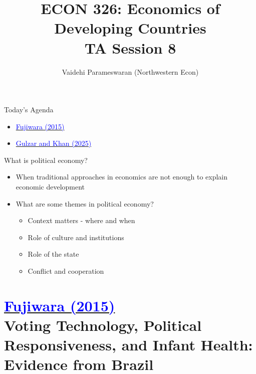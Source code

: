 \documentclass[11pt,notes=hide,aspectratio=169,mathserif]{beamer}
\title[class]{ECON 326: Economics of Developing Countries \\ TA Session 8}
\author[vaidehi's class ]{Vaidehi Parameswaran (Northwestern Econ)}
\date{\monthname[\the\month] \the\year}
\begin{document}
\begin{frame}[plain]
\titlepage
\end{frame}


\begin{frame}{Today's Agenda}

\begin{itemize}
\item \href{https://onlinelibrary-wiley-com.turing.library.northwestern.edu/doi/epdf/10.3982/ECTA18916}{\textcolor{blue}{Fujiwara (2015)}}
\item \href{https://academic.oup.com/restud/article/92/1/339/7627149}{\textcolor{blue}{Gulzar and Khan (2025)}}
\end{itemize}
\end{frame}

\begin{frame}{What is political economy?}

\begin{itemize}
\item When traditional approaches in economics are not enough to explain economic development
\item What are some themes in political economy?
\begin{itemize}
    \item Context matters - where and when 
    \item Role of culture and institutions
    \item Role of the state
    \item Conflict and cooperation
\end{itemize}
\end{itemize}
\end{frame}

\section*{\href{https://onlinelibrary-wiley-com.turing.library.northwestern.edu/doi/epdf/10.3982/ECTA18916}{\textcolor{blue}{Fujiwara (2015)}} \\[5mm] 
\textnormal{\small{Voting Technology, Political Responsiveness, and Infant Health: Evidence from Brazil}}}
\end{document}
